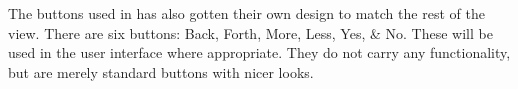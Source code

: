 The buttons used in \projectname{} has also gotten their own design to match the rest of the view.
There are six buttons:
Back, Forth, More, Less, Yes, \& No.
These will be used in the user interface where appropriate.
They do not carry any functionality, but are merely standard buttons with nicer looks.
